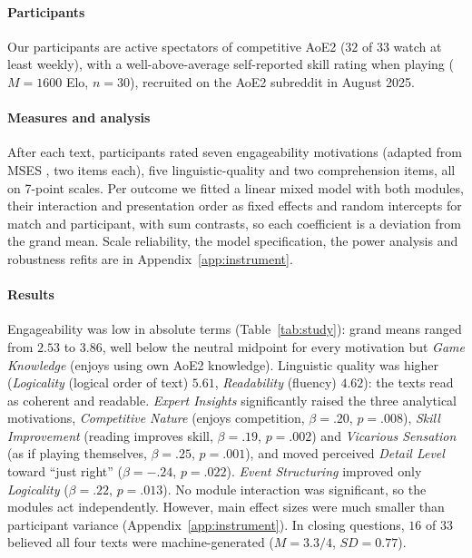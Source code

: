 \documentclass[11pt]{article}
\begin{document}
\paragraph{Participants}
Our participants are active spectators of competitive AoE2 ($32$ of $33$ watch at least weekly), with a well-above-average self-reported skill rating when playing ($M=1600$ Elo, $n=30$), recruited on the AoE2 subreddit in August 2025.

\paragraph{Measures and analysis}
After each text, participants rated seven engageability motivations (adapted from MSES \citep{qian2020}, two items each), five linguistic-quality \citep{callaway2002} and two comprehension items, all on 7-point scales. Per outcome we fitted a linear mixed model with both modules, their interaction and presentation order as fixed effects and random intercepts for match and participant, with sum contrasts, so each coefficient is a deviation from the grand mean. Scale reliability, the model specification, the power analysis and robustness refits are in Appendix~\ref{app:instrument}.

\paragraph{Results}
Engageability was low in absolute terms (Table~\ref{tab:study}): grand means ranged from $2.53$ to $3.86$, well below the neutral midpoint for every motivation but \emph{Game Knowledge} (enjoys using own AoE2 knowledge). Linguistic quality was higher (\emph{Logicality} (logical order of text) $5.61$, \emph{Readability} (fluency) $4.62$): the texts read as coherent and readable. \emph{Expert Insights} significantly raised the three analytical motivations, \emph{Competitive Nature} (enjoys competition, $\beta=.20$, $p=.008$), \emph{Skill Improvement} (reading improves skill, $\beta=.19$, $p=.002$) and \emph{Vicarious Sensation} (as if playing themselves, $\beta=.25$, $p=.001$), and moved perceived \emph{Detail Level} toward ``just right'' ($\beta=-.24$, $p=.022$). \emph{Event Structuring} improved only \emph{Logicality} ($\beta=.22$, $p=.013$). No module interaction was significant, so the modules act independently. However, main effect sizes were much smaller than participant variance (Appendix~\ref{app:instrument}). In closing questions, $16$ of $33$ believed all four texts were machine-generated ($M=3.3/4$, $SD=0.77$).
\end{document}
